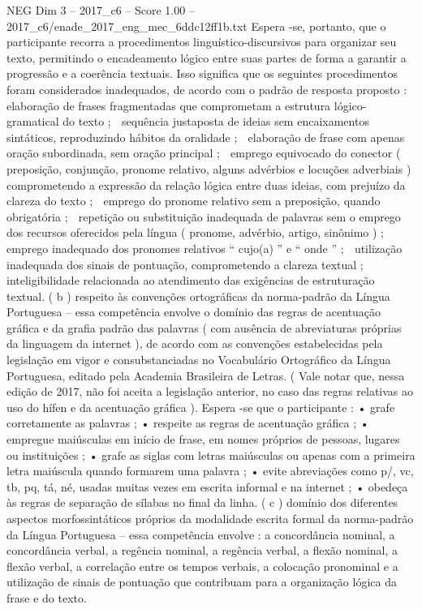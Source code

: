 \begin{textsample}{NEG Dim 3 – 2017\_c6 – Score 1.00 – 2017\_c6/enade\_2017\_eng\_mec\_6ddc12ff1b.txt}
Espera -se, portanto, que o participante recorra a procedimentos linguístico-discursivos para organizar seu texto, permitindo o encadeamento lógico entre suas partes de forma a garantir a progressão e a coerência textuais.
Isso significa que os seguintes procedimentos foram considerados inadequados, de acordo com o padrão de resposta proposto :  elaboração de frases fragmentadas que comprometam a estrutura lógico-gramatical do texto ;  sequência justaposta de ideias sem encaixamentos sintáticos, reproduzindo hábitos da oralidade ;  elaboração de frase com apenas oração subordinada, sem oração principal ;  emprego equivocado do conector ( preposição, conjunção, pronome relativo, alguns advérbios e locuções adverbiais ) comprometendo a expressão da relação lógica entre duas ideias, com prejuízo da clareza do texto ;  emprego do pronome relativo sem a preposição, quando obrigatória ;  repetição ou substituição inadequada de palavras sem o emprego dos recursos oferecidos pela língua ( pronome, advérbio, artigo, sinônimo ) ;  emprego inadequado dos pronomes relativos “ cujo(a) ” e “ onde ” ;  utilização inadequada dos sinais de pontuação, comprometendo a clareza textual ;  inteligibilidade relacionada ao atendimento das exigências de estruturação textual. ( b ) respeito às convenções ortográficas da norma-padrão da Língua Portuguesa – essa competência envolve o domínio das regras de acentuação gráfica e da grafia padrão das palavras ( com ausência de abreviaturas próprias da linguagem da internet ), de acordo com as convenções estabelecidas pela legislação em vigor e consubstanciadas no Vocabulário Ortográfico da Língua Portuguesa, editado pela Academia Brasileira de Letras. ( Vale notar que, nessa edição de 2017, não foi aceita a legislação anterior, no caso das regras relativas ao uso do hífen e da acentuação gráfica ).
Espera -se que o participante : • grafe corretamente as palavras ; • respeite as regras de acentuação gráfica ; • empregue maiúsculas em início de frase, em nomes próprios de pessoas, lugares ou instituições ; • grafe as siglas com letras maiúsculas ou apenas com a primeira letra maiúscula quando formarem uma palavra ; • evite abreviações como p/, vc, tb, pq, tá, né, usadas muitas vezes em escrita informal e na internet ; • obedeça às regras de separação de sílabas no final da linha. ( c ) domínio dos diferentes aspectos morfossintáticos próprios da modalidade escrita formal da norma-padrão da Língua Portuguesa – essa competência envolve : a concordância nominal, a concordância verbal, a regência nominal, a regência verbal, a flexão nominal, a flexão verbal, a correlação entre os tempos verbais, a colocação pronominal e a utilização de sinais de pontuação que contribuam para a organização lógica da frase e do texto.

\end{textsample}
